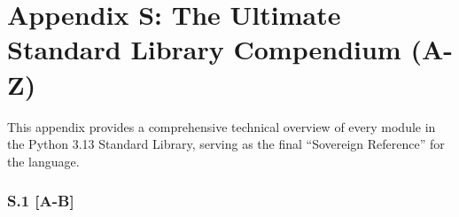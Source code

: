 \hypertarget{appendix-s-the-ultimate-standard-library-compendium-a-z}{%
\chapter{Appendix S: The Ultimate Standard Library Compendium
(A-Z)}\label{appendix-s-the-ultimate-standard-library-compendium-a-z}}

This appendix provides a comprehensive technical overview of every
module in the Python 3.13 Standard Library, serving as the final
``Sovereign Reference'' for the language.

\hypertarget{s.1-a-b}{%
\subsection{S.1 {[}A-B{]}}\label{s.1-a-b}}

